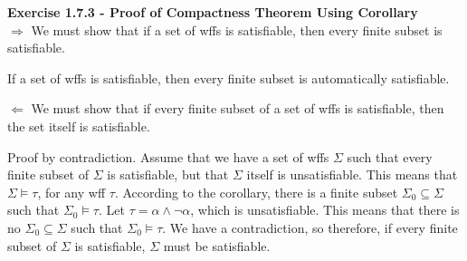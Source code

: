 \documentclass[12pt]{article}	%
\begin{document}
\begin{flushleft}
\vspace{10mm}

\textbf{Exercise 1.7.3 - Proof of Compactness Theorem Using Corollary} \\
$\Rightarrow$ We must show that if a set of wffs is satisfiable, then every finite subset is satisfiable. \\

\vspace{2mm}

If a set of wffs is satisfiable, then every finite subset is automatically satisfiable. \\

\vspace{5mm}

$\Leftarrow$ We must show that if every finite subset of a set of wffs is satisfiable, then the set itself is satisfiable. \\

\vspace{2mm}

Proof by contradiction. Assume that we have a set of wffs $\Sigma$ such that every finite subset of $\Sigma$ is satisfiable, but that $\Sigma$ itself is unsatisfiable. This means that $\Sigma \models \tau$, for any wff $\tau$. According to the corollary, there is a finite subset $\Sigma_0 \subseteq \Sigma$ such that $\Sigma_0 \models \tau$. Let $\tau = \alpha \wedge \neg\alpha$, which is unsatisfiable. This means that there is no $\Sigma_0 \subseteq \Sigma$ such that $\Sigma_0 \models \tau$. We have a contradiction, so therefore, if every finite subset of $\Sigma$ is satisfiable, $\Sigma$ must be satisfiable.

\end{flushleft}
%
%
\end{document}
